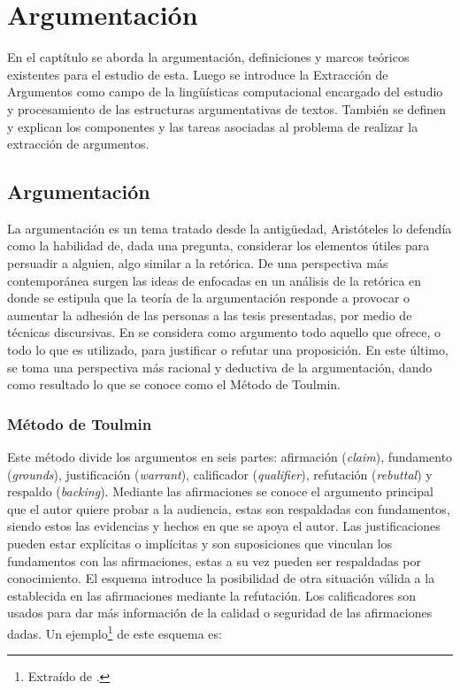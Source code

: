 \chapter{Argumentación}\label{chapter:argumentation}

En el captítulo se aborda la argumentación, definiciones y marcos teóricos existentes para el estudio de esta.
Luego se introduce la Extracción de Argumentos como campo de la lingüísticas computacional encargado del estudio 
y procesamiento de las estructuras argumentativas de textos. También se definen y explican los componentes y las tareas 
asociadas al problema de realizar la extracción de argumentos.

\section{Argumentación}

La argumentación es un tema tratado desde la antigüedad, Aristóteles lo defendía como la 
habilidad de, dada una pregunta, considerar los elementos útiles para persuadir a alguien, algo
similar a la retórica. De una perspectiva más contemporánea surgen las ideas de 
\textcite{perelman1969rhetoric}
enfocadas en un análisis de la retórica en donde se estipula que la teoría de la argumentación
responde a provocar o aumentar la adhesión de las personas a las tesis presentadas, por medio de 
técnicas discursivas. En 
\textcite{toulmin_2003}
se considera como argumento todo aquello que ofrece, 
o todo lo que es utilizado, para justificar o refutar una proposición. En este último, se toma 
una perspectiva más racional y deductiva de la argumentación, dando como resultado lo que se 
conoce como el Método de Toulmin. 

\subsection{Método de Toulmin}

Este método divide los argumentos en seis partes: afirmación 
(\emph{claim}), fundamento (\emph{grounds}), justificación (\emph{warrant}), calificador 
(\emph{qualifier}), refutación (\emph{rebuttal}) y respaldo (\emph{backing}).
Mediante las afirmaciones se conoce el argumento principal que el autor quiere probar a la audiencia,
estas son respaldadas con fundamentos, siendo estos las evidencias y hechos en que se apoya el autor.
Las justificaciones pueden estar explícitas o implícitas y son suposiciones que vinculan los
fundamentos con las afirmaciones, estas a su vez pueden ser respaldadas por conocimiento.
El esquema introduce la posibilidad de otra situación válida a la establecida en las afirmaciones
mediante la refutación. Los calificadores son usados para dar más información de la calidad o seguridad
de las afirmaciones dadas. Un ejemplo\footnote{Extraído de  
\textcite{toulminArgument}.
} de este esquema es:

